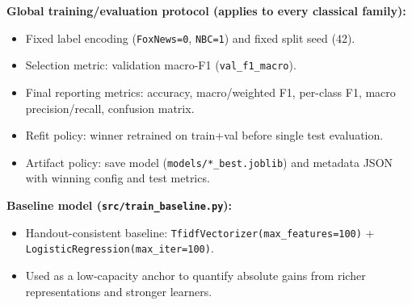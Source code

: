 \documentclass[10pt]{article}
\begin{document}
\textbf{Global training/evaluation protocol (applies to every classical family):}
\begin{itemize}
    \item Fixed label encoding (\texttt{FoxNews=0}, \texttt{NBC=1}) and fixed split seed (42).
    \item Selection metric: validation macro-F1 (\texttt{val\_f1\_macro}).
    \item Final reporting metrics: accuracy, macro/weighted F1, per-class F1, macro precision/recall, confusion matrix.
    \item Refit policy: winner retrained on train+val before single test evaluation.
    \item Artifact policy: save model (\texttt{models/*\_best.joblib}) and metadata JSON with winning config and test metrics.
\end{itemize}

\textbf{Baseline model (\texttt{src/train\_baseline.py}):}
\begin{itemize}
    \item Handout-consistent baseline: \texttt{TfidfVectorizer(max\_features=100)} + \texttt{LogisticRegression(max\_iter=100)}.
    \item Used as a low-capacity anchor to quantify absolute gains from richer representations and stronger learners.
\end{itemize}
\end{document}
